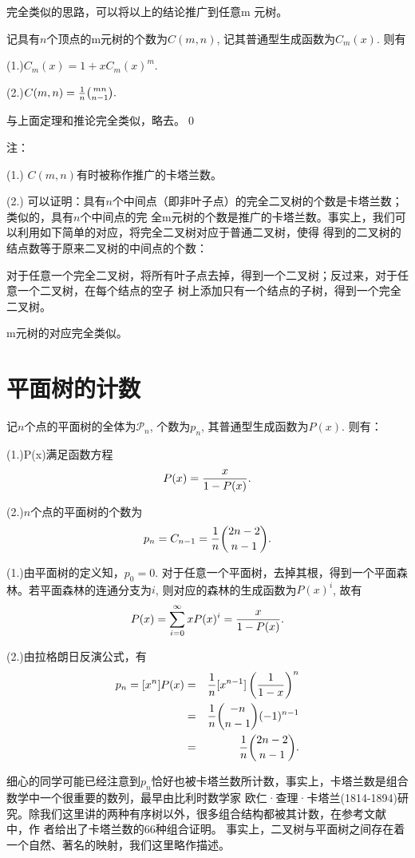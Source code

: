 \documentclass[a4paper,11pt]{article}
\def\pf{\noindent {\bf 证明\ }}
\begin{document}
完全类似的思路，可以将以上的结论推广到任意m 元树。
{
\thm 记具有$n$个顶点的m元树的个数为$C(m,n)$, 记其普通型生成函数为$C_m(x)$. 则有

(1.)$C_m(x)=1+xC_m(x)^m.$

(2.)$C(m,n)={1\over n}{mn\choose n-1}.$
}

{
\pf 与上面定理和推论完全类似，略去。\qed
}

注：
{\itemize
\item[(1.)]$C(m,n)$有时被称作推广的卡塔兰数。

\item[(2.)]可以证明：具有$n$个中间点（即非叶子点）的完全二叉树的个数是卡塔兰数；类似的，具有$n$个中间点的完
全m元树的个数是推广的卡塔兰数。事实上，我们可以利用如下简单的对应，将完全二叉树对应于普通二叉树，使得
得到的二叉树的结点数等于原来二叉树的中间点的个数：

对于任意一个完全二叉树，将所有叶子点去掉，得到一个二叉树；反过来，对于任意一个二叉树，在每个结点的空子
树上添加只有一个结点的子树，得到一个完全二叉树。

m元树的对应完全类似。

}


\section{平面树的计数} { \thm
记$n$个点的平面树的全体为$\mathcal{P}_n$, 个数为$p_n$,
其普通型生成函数为$P(x)$. 则有：

(1.)P(x)满足函数方程
$$P(x)={x\over1-P(x)}.$$

(2.)$n$个点的平面树的个数为
$$p_n=C_{n-1}={1\over n}{2n-2\choose n-1}.$$

}
{
\pf (1.)由平面树的定义知，$p_0=0$. 对于任意一个平面树，去掉其根，得到一个平面森林。若平面森林的连通分支为$i$, 则对应的森林的生成函数为$P(x)^i$, 故有
$$P(x)=\sum_{i=0}^\infty xP(x)^i={x\over1-P(x)}.$$

(2.)由拉格朗日反演公式，有
\begin{eqnarray*}
p_n=[x^n]P(x)&=&{1\over n}[x^{n-1}]\left({1\over 1-x}\right)^n\\
&=&{1\over n}{-n\choose n-1}(-1)^{n-1}\\
&=&{1\over n}{2n-2\choose n-1}.
\end{eqnarray*}
}

细心的同学可能已经注意到$p_n$恰好也被卡塔兰数所计数，事实上，卡塔兰数是组合数学中一个很重要的数列，最早由比利时数学家
欧仁·查理·卡塔兰(1814-1894)研究。除我们这里讲的两种有序树以外，很多组合结构都被其计数，在参考文献\cite{Stanley2004_2} 中，作
者给出了卡塔兰数的$66$种组合证明。 事实上，二叉树与平面树之间存在着一个自然、著名的映射，我们这里略作描述。
\end{document}
